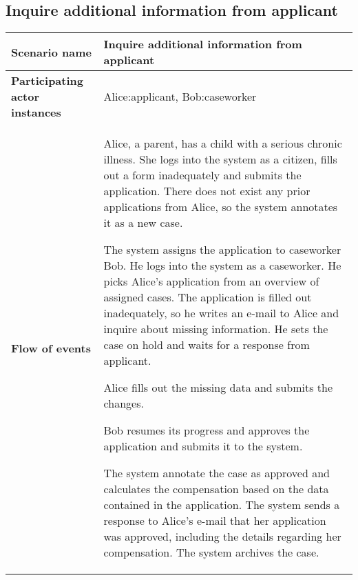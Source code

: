 \subsection*{Inquire additional information from applicant}
\begin{table}[htb!]
\begin{tabularx}{\textwidth}{l|X}
	\textbf{Scenario name} & Inquire additional information from applicant \\
	\hline
	\textbf{Participating actor instances} & Alice:applicant, Bob:caseworker\\
	\hline
	\textbf{Flow of events} &
	\begin{compactenum}
	        \item Alice, a parent, has a child with a serious chronic illness. She logs into the system as a citizen, fills out a form inadequately and submits the application. There does not exist any prior applications from Alice, so the system annotates it as a new case.
	        \item The system assigns the application to caseworker Bob. He logs into the system as a caseworker. He picks Alice's application from an overview of assigned cases. The application is filled out inadequately, so he writes an e-mail to Alice and inquire about missing information. He sets the case on hold and waits for a response from applicant.
	        \item Alice fills out the missing data and submits the changes. 
	        \item Bob resumes its progress and approves the application and submits it to the system.
	        \item The system annotate the case as approved and calculates the compensation based on the data contained in the application. The system sends a response to Alice's e-mail that her application was approved, including the details regarding her compensation. The system archives the case.
	\end{compactenum}\\
	\hline
\end{tabularx}
\end{table}

\newpage
